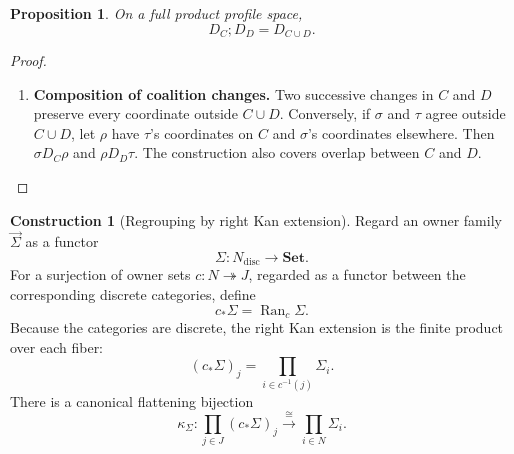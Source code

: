\documentclass[11pt,a4paper]{article}
\numberwithin{equation}{section}
\newtheorem{proposition}[theorem]{Proposition}
\theoremstyle{definition}
\newtheorem{construction}[construction]{Construction}
\theoremstyle{remark}
\theoremstyle{plain}
\begin{document}
\begin{proposition}
\label{prop:egt-coalition-composition}
On a full product profile space,
\[
 D_C;D_D=D_{C\cup D}.
\]
\end{proposition}
\begin{proof}
\leavevmode
\begin{enumerate}[label=\textup{(\arabic*)},leftmargin=*,itemsep=4pt,topsep=3pt]
  \item \textbf{Composition of coalition changes.} Two successive changes in $C$ and $D$ preserve every coordinate outside
$C\cup D$. Conversely, if $\sigma$ and $\tau$ agree outside $C\cup D$,
let $\rho$ have $\tau$'s coordinates on $C$ and $\sigma$'s coordinates
elsewhere. Then $\sigma D_C\rho$ and $\rho D_D\tau$. The construction
also covers overlap between $C$ and $D$.
\end{enumerate}
\end{proof}

\begin{construction}[Regrouping by right Kan extension]
Regard an owner
family $\vec\Sigma$ as a functor
\[
 \Sigma:N_{\mathrm{disc}}\longrightarrow\mathbf{Set}.
\]
For a surjection of owner sets $c:N\twoheadrightarrow J$, regarded as a
functor between the corresponding discrete categories, define
\[
 c_*\Sigma=\operatorname{Ran}_c\Sigma.
\]
Because the categories are discrete, the right Kan extension is the finite
product over each fiber:
\begin{equation}
\label{eq:egt-owner-kan}
 (c_*\Sigma)_j
 =\prod_{i\in c^{-1}(j)}\Sigma_i.
\end{equation}
There is a canonical flattening bijection
\begin{equation}
\label{eq:egt-owner-flattening}
 \kappa_\Sigma:
 \prod_{j\in J}(c_*\Sigma)_j
 \xrightarrow{\ \cong\ }
 \prod_{i\in N}\Sigma_i.
\end{equation}
\end{construction}
\end{document}
